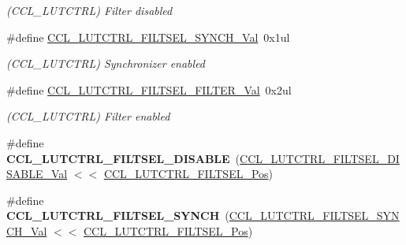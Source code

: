 \begin{DoxyCompactItemize}
\begin{DoxyCompactList}\small\item\em (C\+C\+L\+\_\+\+L\+U\+T\+C\+T\+R\+L) Filter disabled \end{DoxyCompactList}\item 
\hypertarget{group___s_a_m_l21___c_c_l_gab1c18dbb5d94f7a480c8dd9e083b471d}{}\#define \hyperlink{group___s_a_m_l21___c_c_l_gab1c18dbb5d94f7a480c8dd9e083b471d}{C\+C\+L\+\_\+\+L\+U\+T\+C\+T\+R\+L\+\_\+\+F\+I\+L\+T\+S\+E\+L\+\_\+\+S\+Y\+N\+C\+H\+\_\+\+Val}~0x1ul\label{group___s_a_m_l21___c_c_l_gab1c18dbb5d94f7a480c8dd9e083b471d}

\begin{DoxyCompactList}\small\item\em (C\+C\+L\+\_\+\+L\+U\+T\+C\+T\+R\+L) Synchronizer enabled \end{DoxyCompactList}\item 
\hypertarget{group___s_a_m_l21___c_c_l_ga746ff0c425c61df00bf0ff42c89e2300}{}\#define \hyperlink{group___s_a_m_l21___c_c_l_ga746ff0c425c61df00bf0ff42c89e2300}{C\+C\+L\+\_\+\+L\+U\+T\+C\+T\+R\+L\+\_\+\+F\+I\+L\+T\+S\+E\+L\+\_\+\+F\+I\+L\+T\+E\+R\+\_\+\+Val}~0x2ul\label{group___s_a_m_l21___c_c_l_ga746ff0c425c61df00bf0ff42c89e2300}

\begin{DoxyCompactList}\small\item\em (C\+C\+L\+\_\+\+L\+U\+T\+C\+T\+R\+L) Filter enabled \end{DoxyCompactList}\item 
\hypertarget{group___s_a_m_l21___c_c_l_ga5f05bae5523ba8e5e019e5ed36e914bd}{}\#define {\bfseries C\+C\+L\+\_\+\+L\+U\+T\+C\+T\+R\+L\+\_\+\+F\+I\+L\+T\+S\+E\+L\+\_\+\+D\+I\+S\+A\+B\+L\+E}~(\hyperlink{group___s_a_m_l21___c_c_l_ga269930d96ab20ca97bf3e8dc99362a12}{C\+C\+L\+\_\+\+L\+U\+T\+C\+T\+R\+L\+\_\+\+F\+I\+L\+T\+S\+E\+L\+\_\+\+D\+I\+S\+A\+B\+L\+E\+\_\+\+Val} $<$$<$ \hyperlink{group___s_a_m_l21___c_c_l_ga671613b8892335b9651f695fb293057a}{C\+C\+L\+\_\+\+L\+U\+T\+C\+T\+R\+L\+\_\+\+F\+I\+L\+T\+S\+E\+L\+\_\+\+Pos})\label{group___s_a_m_l21___c_c_l_ga5f05bae5523ba8e5e019e5ed36e914bd}

\item 
\hypertarget{group___s_a_m_l21___c_c_l_ga966b10c22eff71d348faae08803639be}{}\#define {\bfseries C\+C\+L\+\_\+\+L\+U\+T\+C\+T\+R\+L\+\_\+\+F\+I\+L\+T\+S\+E\+L\+\_\+\+S\+Y\+N\+C\+H}~(\hyperlink{group___s_a_m_l21___c_c_l_gab1c18dbb5d94f7a480c8dd9e083b471d}{C\+C\+L\+\_\+\+L\+U\+T\+C\+T\+R\+L\+\_\+\+F\+I\+L\+T\+S\+E\+L\+\_\+\+S\+Y\+N\+C\+H\+\_\+\+Val} $<$$<$ \hyperlink{group___s_a_m_l21___c_c_l_ga671613b8892335b9651f695fb293057a}{C\+C\+L\+\_\+\+L\+U\+T\+C\+T\+R\+L\+\_\+\+F\+I\+L\+T\+S\+E\+L\+\_\+\+Pos})\label{group___s_a_m_l21___c_c_l_ga966b10c22eff71d348faae08803639be}


\end{DoxyCompactItemize}

